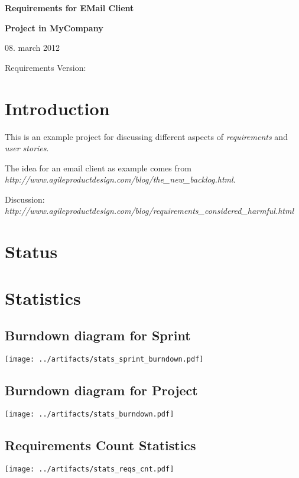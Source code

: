 \documentclass{report}
\begin{document}
\thispagestyle{empty}

\mbox{}

\vfill

{\LARGE\textbf{Requirements for EMail Client}}

\vfill

{\Large\textbf{Project in MyCompany}}

\vfill

08. march 2012

\vfill

Requirements Version: 

\vfill

\newpage

\tableofcontents

\newpage

\chapter{Introduction}
This is an example project for discussing different aspects of
\textsl{requirements} and \textsl{user stories}.

The idea for an email client as example comes from
\textsl{http://www.agileproductdesign.com/blog/the\_new\_backlog.html}.

Discussion: \textsl{http://www.agileproductdesign.com/blog/requirements\_considered\_harmful.html}

\chapter{Status}




\chapter{Statistics}
\section{Burndown diagram for Sprint}
\texttt{[image: ../artifacts/stats\_sprint\_burndown.pdf]}

\section{Burndown diagram for Project}
\texttt{[image: ../artifacts/stats\_burndown.pdf]}

\section{Requirements Count Statistics}
\texttt{[image: ../artifacts/stats\_reqs\_cnt.pdf]}
\end{document}
